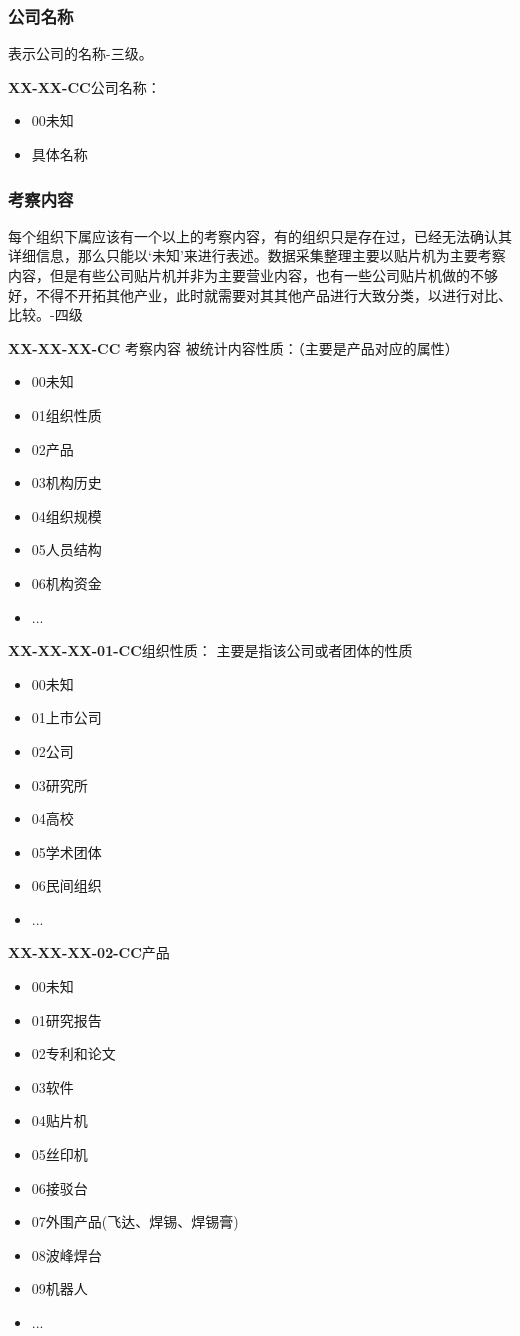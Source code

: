 \documentclass[a4paper,12pt,UTF8]{article}
\begin{document}
\subsubsection{公司名称}表示公司的名称-三级。

\textbf{XX-XX-CC}公司名称：
\begin{itemize}
  \item 00未知%
  \item 具体名称
\end{itemize}

\subsubsection{考察内容}
每个组织下属应该有一个以上的考察内容，有的组织只是存在过，已经无法确认其详细信息，那么只能以‘未知’来进行表述。数据采集整理主要以贴片机为主要考察内容，但是有些公司贴片机并非为主要营业内容，也有一些公司贴片机做的不够好，不得不开拓其他产业，此时就需要对其其他产品进行大致分类，以进行对比、比较。-四级

\textbf{XX-XX-XX-CC} 考察内容
被统计内容性质：（主要是产品对应的属性）
\begin{itemize}
  \item 00未知%
  \item 01组织性质
  \item 02产品
  \item 03机构历史
  \item 04组织规模
  \item 05人员结构
  \item 06机构资金
  \item ...
\end{itemize}

\textbf{XX-XX-XX-01-CC}组织性质： 主要是指该公司或者团体的性质
\begin{itemize}
  \item 00未知%
  \item 01上市公司
  \item 02公司
  \item 03研究所
  \item 04高校
  \item 05学术团体
  \item 06民间组织
  \item ...
\end{itemize}

\textbf{XX-XX-XX-02-CC}产品
\begin{itemize}
  \item 00未知%
  \item 01研究报告%
  \item 02专利和论文%
  \item 03软件
  \item 04贴片机
  \item 05丝印机
  \item 06接驳台
  \item 07外围产品(飞达、焊锡、焊锡膏)
  \item 08波峰焊台
  \item 09机器人
  \item ...
\end{itemize}
\end{document}
